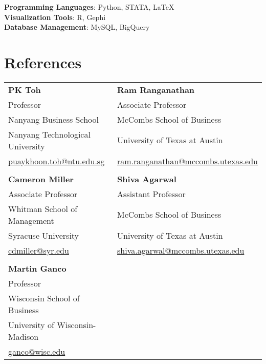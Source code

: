 \documentclass[a4paper,11pt]{article}
\begin{document}
\textbf{Programming Languages}{: Python, STATA, \LaTeX}
\\
\textbf{Visualization Tools}{: R, Gephi}
\\
\textbf{Database Management}{: MySQL, BigQuery}

\section{References}
\begin{tabular*}{\textwidth}{@{\extracolsep{\fill}} l l}
    \textbf{PK Toh} & \textbf{Ram Ranganathan} \\
    Professor & Associate Professor \\
    Nanyang Business School & McCombs School of Business \\
    Nanyang Technological University & University of Texas at Austin \\
    \href{mailto:puaykhoon.toh@ntu.edu.sg}{puaykhoon.toh@ntu.edu.sg} & \href{mailto:ram.ranganathan@mccombs.utexas.edu}{ram.ranganathan@mccombs.utexas.edu} \\
    \\
    \textbf{Cameron Miller} & \textbf{Shiva Agarwal} \\
    Associate Professor & Assistant Professor \\
    Whitman School of Management & McCombs School of Business \\
    Syracuse University & University of Texas at Austin \\
    \href{mailto:cdmiller@syr.edu}{cdmiller@syr.edu} & 
    \href{mailto:shiva.agarwal@mccombs.utexas.edu}{shiva.agarwal@mccombs.utexas.edu} \\
    \\
    \textbf{Martin Ganco} \\
    Professor \\
    Wisconsin School of Business \\
    University of Wisconsin-Madison \\
    \href{mailto:ganco@wisc.edu}{ganco@wisc.edu}
\end{tabular*}

\end{document}
